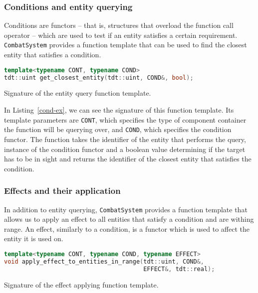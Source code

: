 \subsubsection{Conditions and entity querying}

Conditions are functors -- that is, structures that overload the function call operator -- which are used to test if an entity satisfies
a certain requirement. \texttt{CombatSystem} provides a function template that can be used to find the closest entity that satisfies
a condition.

\begin{listing}
    \centering
    \begin{lstlisting}[language=C++]
template<typename CONT, typename COND>
tdt::uint get_closest_entity(tdt::uint, COND&, bool);
    \end{lstlisting}
    \caption{Signature of the entity query function template.}
    \label{cond-ex}
\end{listing}

In Listing~\ref{cond-ex}, we can see the signature of this function template. Its template parameters are \texttt{CONT}, which specifies
the type of component container the function will be querying over, and \texttt{COND}, which specifies the condition functor. The function
takes the identifier of the entity that performs the query, instance of the condition functor and a boolean value determining if the
target has to be in sight and returns the identifier of the closest entity that satisfies the condition.

\subsubsection{Effects and their application}

In addition to entity querying, \texttt{CombatSystem} provides a function template that allows us to apply an effect to all entities
that satisfy a condition and are withing range. An effect, similarly to a condition, is a functor which is used to affect the entity
it is used on.

\begin{listing}
    \centering
    \begin{lstlisting}[language=C++]
template<typename CONT, typename COND, typename EFFECT>
void apply_effect_to_entities_in_range(tdt::uint, COND&,
                                       EFFECT&, tdt::real);
    \end{lstlisting}
    \caption{Signature of the effect applying function template.}
    \label{effect-ex}
\end{listing}

